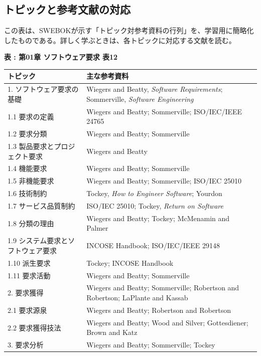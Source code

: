 \subsection{トピックと参考文献の対応}

この表は、SWEBOKが示す「トピック対参考資料の行列」を、学習用に簡略化したものである。詳しく学ぶときは、各トピックに対応する文献を読む。

\small
\par\smallskip\noindent{}\label{tab:ch01-12}\textbf{表 \thetable: 第01章 ソフトウェア要求 表12}\par\smallskip
\begin{longtable}{@{}p{.38\linewidth}p{.55\linewidth}@{}}
\toprule
トピック & 主な参考資料 \\
\midrule
\endhead
1. ソフトウェア要求の基礎 & Wiegers and Beatty, \textit{Software Requirements}; Sommerville, \textit{Software Engineering} \\
1.1 要求の定義 & Wiegers and Beatty; Sommerville; ISO/IEC/IEEE 24765 \\
1.2 要求分類 & Wiegers and Beatty; Sommerville \\
1.3 製品要求とプロジェクト要求 & Wiegers and Beatty \\
1.4 機能要求 & Wiegers and Beatty; Sommerville \\
1.5 非機能要求 & Wiegers and Beatty; Sommerville; ISO/IEC 25010 \\
1.6 技術制約 & Tockey, \textit{How to Engineer Software}; Yourdon \\
1.7 サービス品質制約 & ISO/IEC 25010; Tockey, \textit{Return on Software} \\
1.8 分類の理由 & Wiegers and Beatty; Tockey; McMenamin and Palmer \\
1.9 システム要求とソフトウェア要求 & INCOSE Handbook; ISO/IEC/IEEE 29148 \\
1.10 派生要求 & Tockey; INCOSE Handbook \\
1.11 要求活動 & Wiegers and Beatty; Sommerville \\
2. 要求獲得 & Wiegers and Beatty; Sommerville; Robertson and Robertson; LaPlante and Kassab \\
2.1 要求源泉 & Wiegers and Beatty; Robertson and Robertson \\
2.2 要求獲得技法 & Wiegers and Beatty; Wood and Silver; Gottesdiener; Brown and Katz \\
3. 要求分析 & Wiegers and Beatty; Sommerville; Tockey \\

\end{longtable}
